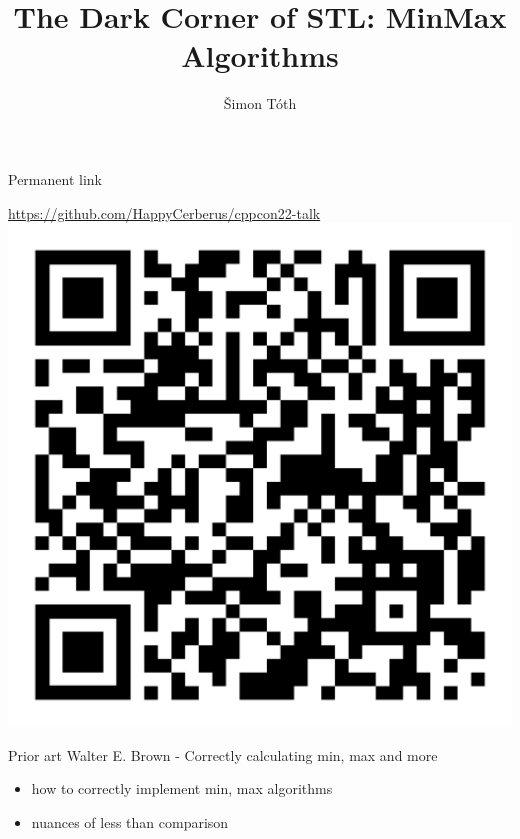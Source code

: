 \documentclass[aspectratio=169]{beamer}
\title{The Dark Corner of STL: MinMax Algorithms}
\author{Šimon Tóth}
\begin{document}
{
\begin{frame}[plain]
\end{frame}
}


\begin{frame}{Permanent link}
    \begin{center}
        \Large\href{https://github.com/HappyCerberus/cppcon22-talk}{https://github.com/HappyCerberus/cppcon22-talk}\\
        \includegraphics[width=.4\textwidth]{static/qr-code.png}
    \end{center}
\end{frame}

\begin{frame}{Prior art}
Walter E. Brown - Correctly calculating min, max and more
\begin{itemize}
    \item how to correctly implement min, max algorithms
    \item nuances of less than comparison
\end{itemize}
\end{frame}
\end{document}
